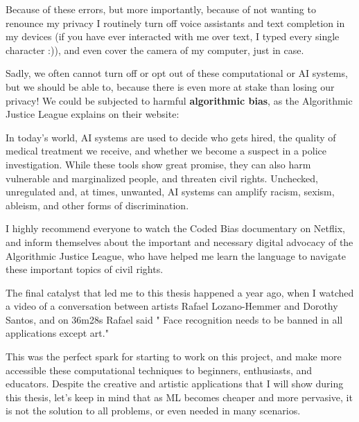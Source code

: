 Because of these errors, but more importantly, because of not wanting to renounce my privacy I routinely turn off voice assistants and text completion in my devices (if you have ever interacted with me over text, I typed every single character :)), and even cover the camera of my computer, just in case.

Sadly, we often cannot turn off or opt out of these computational or \acrshort{AI} systems, but we should be able to, because there is even more at stake than losing our privacy! We could be subjected to harmful \textbf{algorithmic bias}, as the Algorithmic Justice League explains on their website:

\begin{displayquote}
In today’s world, AI systems are used to decide who gets hired, the quality of medical treatment we receive, and whether we become a suspect in a police investigation. While these tools show great promise, they can also harm vulnerable and marginalized people, and threaten civil rights. Unchecked, unregulated and, at times, unwanted, AI systems can amplify racism, sexism, ableism, and other forms of discrimination.\cite{website-algorithmic-justice-league}
\end{displayquote}

I highly recommend everyone to watch the Coded Bias documentary on Netflix, and inform themselves about the important and necessary digital advocacy of the Algorithmic Justice League, who have helped me learn the language to navigate these important topics of civil rights.

The final catalyst that led me to this thesis happened a year ago, when I watched a video \cite{website-talk-technology-and-public-art-rafael-lozano-hemmer} of a conversation between artists Rafael Lozano-Hemmer and Dorothy Santos, and on 36m28s Rafael said " Face recognition needs to be banned in all applications except art."

This was the perfect spark for starting to work on this project, and make more accessible these computational techniques to beginners, enthusiasts, and educators. Despite the creative and artistic applications that I will show during this thesis, let's keep in mind that as \acrshort{ML} becomes cheaper and more pervasive, it is not the solution to all problems, or even needed in many scenarios.

